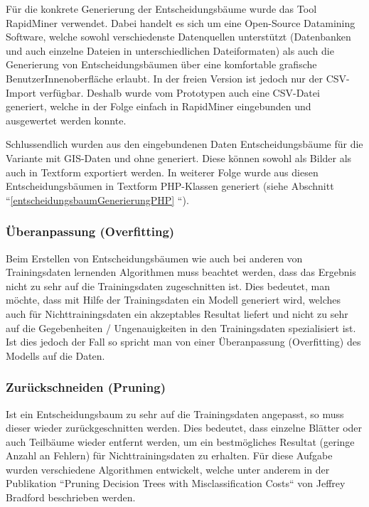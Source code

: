 Für die konkrete Generierung der Entscheidungsbäume wurde das Tool RapidMiner verwendet. Dabei handelt es sich um eine Open-Source Datamining Software, welche sowohl verschiedenste Datenquellen unterstützt (Datenbanken und auch einzelne Dateien in unterschiedlichen Dateiformaten) als auch die Generierung von Entscheidungsbäumen über eine komfortable grafische BenutzerInnenoberfläche erlaubt. In der freien Version ist jedoch nur der CSV-Import verfügbar. Deshalb wurde vom Prototypen auch eine CSV-Datei generiert, welche in der Folge einfach in RapidMiner eingebunden und ausgewertet werden konnte. 

Schlussendlich wurden aus den eingebundenen Daten Entscheidungsbäume für die Variante mit GIS-Daten und ohne generiert. Diese können sowohl als Bilder als auch in Textform exportiert werden. In weiterer Folge wurde aus diesen Entscheidungsbäumen in Textform PHP-Klassen generiert (siehe Abschnitt ``\ref{entscheidungsbaumGenerierungPHP} ``).

\subsubsection{Überanpassung (Overfitting)}
Beim Erstellen von Entscheidungsbäumen wie auch bei anderen von Trainingsdaten lernenden Algorithmen muss beachtet werden, dass das Ergebnis nicht zu sehr auf die Trainingsdaten zugeschnitten ist. Dies bedeutet, man möchte, dass mit Hilfe der Trainingsdaten ein Modell generiert wird, welches auch für Nichttrainingsdaten ein akzeptables Resultat liefert und nicht zu sehr auf die Gegebenheiten / Ungenauigkeiten in den Trainingsdaten spezialisiert ist. Ist dies jedoch der Fall so spricht man von einer Überanpassung (Overfitting) des Modells auf die Daten.  \cite{tom_dietterich_overfitting_1995}

\subsubsection{Zurückschneiden (Pruning)}
Ist ein Entscheidungsbaum zu sehr  auf die Trainingsdaten angepasst, so muss dieser wieder zurückgeschnitten werden. Dies bedeutet, dass einzelne Blätter oder auch Teilbäume wieder entfernt werden, um ein bestmögliches Resultat (geringe Anzahl an Fehlern) für Nichttrainingsdaten zu erhalten. Für diese Aufgabe wurden verschiedene Algorithmen entwickelt, welche unter anderem in der Publikation ``Pruning Decision Trees with Misclassification Costs`` von Jeffrey Bradford beschrieben werden. \cite{jeffrey_p._bradford_pruning_1998}

